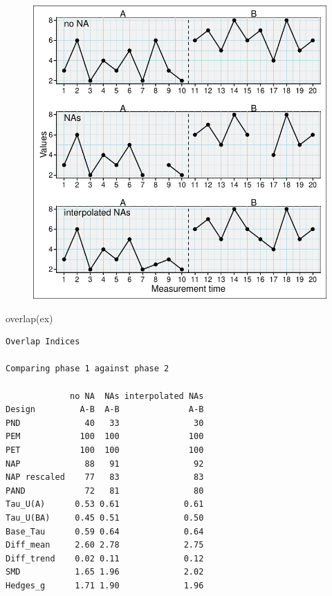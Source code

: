 \documentclass[
  letterpaper,
  DIV=11,
  numbers=noendperiod]{scrreprt}
\newenvironment{Shaded}{\begin{snugshade}}{\end{snugshade}}
\newcommand{\FunctionTok}[1]{\textcolor[rgb]{0.28,0.35,0.67}{#1}}
\newcommand{\NormalTok}[1]{\textcolor[rgb]{0.00,0.23,0.31}{#1}}
\begin{document}
\begin{figure}[H]

{\centering \includegraphics{./ch_missing_values_outliers_files/figure-pdf/fillmissing-example-1.pdf}

}

\end{figure}

\begin{Shaded}
\begin{Highlighting}[]
\FunctionTok{overlap}\NormalTok{(ex)}
\end{Highlighting}
\end{Shaded}

\begin{verbatim}
Overlap Indices

Comparing phase 1 against phase 2 

             no NA  NAs interpolated NAs
Design         A-B  A-B              A-B
PND             40   33               30
PEM            100  100              100
PET            100  100              100
NAP             88   91               92
NAP rescaled    77   83               83
PAND            72   81               80
Tau_U(A)      0.53 0.61             0.61
Tau_U(BA)     0.45 0.51             0.50
Base_Tau      0.59 0.64             0.64
Diff_mean     2.60 2.78             2.75
Diff_trend    0.02 0.11             0.12
SMD           1.65 1.96             2.02
Hedges_g      1.71 1.90             1.96
\end{verbatim}
\end{document}
